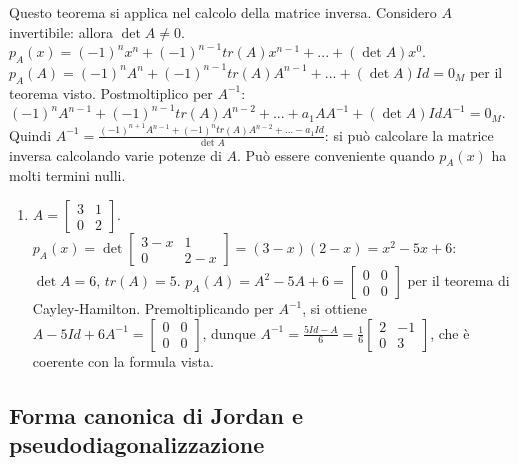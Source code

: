 \documentclass{article}
\begin{document}
Questo teorema si applica nel calcolo della matrice inversa. Considero $A$
invertibile: allora $\det A\neq 0$. $p_{A}\left( x\right) =\left( -1\right)
^{n}x^{n}+\left( -1\right) ^{n-1}tr\left( A\right) x^{n-1}+...+\left( \det
A\right) x^{0}$. $p_{A}\left( A\right) =\left( -1\right) ^{n}A^{n}+\left(
-1\right) ^{n-1}tr\left( A\right) A^{n-1}+...+\left( \det A\right) Id=0_{M}$
per il teorema visto. Postmoltiplico per $A^{-1}$: $\left( -1\right)
^{n}A^{n-1}+\left( -1\right) ^{n-1}tr\left( A\right)
A^{n-2}+...+a_{1}AA^{-1}+\left( \det A\right) IdA^{-1}=0_{M}$. Quindi $%
A^{-1}=\frac{\left( -1\right) ^{n+1}A^{n-1}+\left( -1\right) ^{n}tr\left(
A\right) A^{n-2}+...-a_{1}Id}{\det A}$: si pu\`{o} calcolare la matrice
inversa calcolando varie potenze di $A$. Pu\`{o} essere conveniente quando $%
p_{A}\left( x\right) $ ha molti termini nulli.

\begin{enumerate}
\item $A=\left[ 
\begin{array}{cc}
3 & 1 \\ 
0 & 2%
\end{array}%
\right] $. $p_{A}\left( x\right) =\det \left[ 
\begin{array}{cc}
3-x & 1 \\ 
0 & 2-x%
\end{array}%
\right] =\left( 3-x\right) \left( 2-x\right) =x^{2}-5x+6$: $\det A=6$, $%
tr\left( A\right) =5$. $p_{A}\left( A\right) =A^{2}-5A+6=\left[ 
\begin{array}{cc}
0 & 0 \\ 
0 & 0%
\end{array}%
\right] $ per il teorema di Cayley-Hamilton. Premoltiplicando per $A^{-1}$,
si ottiene $A-5Id+6A^{-1}=\left[ 
\begin{array}{cc}
0 & 0 \\ 
0 & 0%
\end{array}%
\right] $, dunque $A^{-1}=\frac{5Id-A}{6}=\frac{1}{6}\left[ 
\begin{array}{cc}
2 & -1 \\ 
0 & 3%
\end{array}%
\right] $, che \`{e} coerente con la formula vista.
\end{enumerate}

\subsection{Forma canonica di Jordan e pseudodiagonalizzazione}
\end{document}
